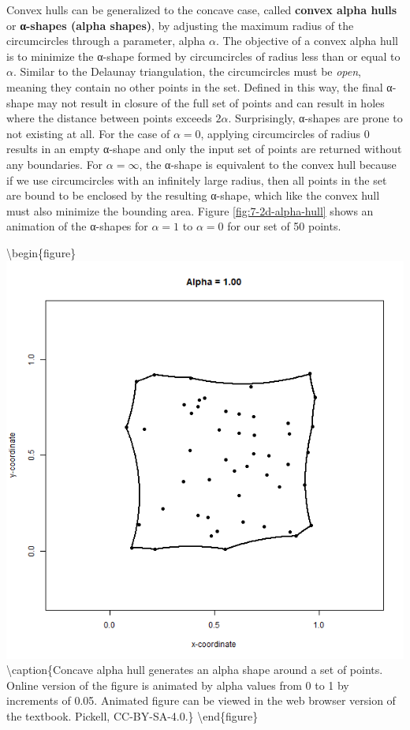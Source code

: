 \documentclass[
]{book}
\begin{document}
Convex hulls can be generalized to the concave case, called \textbf{convex alpha hulls} or \textbf{α-shapes (alpha shapes)}, by adjusting the maximum radius of the circumcircles through a parameter, alpha \(α\). The objective of a convex alpha hull is to minimize the α-shape formed by circumcircles of radius less than or equal to \(α\). Similar to the Delaunay triangulation, the circumcircles must be \emph{open}, meaning they contain no other points in the set. Defined in this way, the final α-shape may not result in closure of the full set of points and can result in holes where the distance between points exceeds \(2α\). Surprisingly, α-shapes are prone to not existing at all. For the case of \(α=0\), applying circumcircles of radius 0 results in an empty α-shape and only the input set of points are returned without any boundaries. For \(α=∞\), the α-shape is equivalent to the convex hull because if we use circumcircles with an infinitely large radius, then all points in the set are bound to be enclosed by the resulting α-shape, which like the convex hull must also minimize the bounding area. Figure \ref{fig:7-2d-alpha-hull} shows an animation of the α-shapes for \(α=1\) to \(α=0\) for our set of 50 points.

\textbackslash begin\{figure\}
\includegraphics[width=0.75\linewidth]{images/07-2d-alpha-hull-static} \textbackslash caption\{Concave alpha hull generates an alpha shape around a set of points. Online version of the figure is animated by alpha values from 0 to 1 by increments of 0.05. Animated figure can be viewed in the web browser version of the textbook. Pickell, CC-BY-SA-4.0.\}\label{fig:7-2d-alpha-hull}
\textbackslash end\{figure\}
\end{document}
